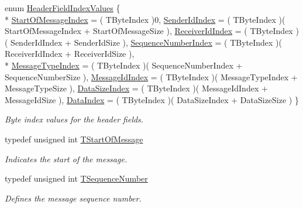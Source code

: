 \begin{DoxyCompactItemize}
enum \hyperlink{class_terra_swarm_1_1_message_header_a2a96f83a96cfee0465da982814cb372a}{Header\-Field\-Index\-Values} \{ \\*
\hyperlink{class_terra_swarm_1_1_message_header_a2a96f83a96cfee0465da982814cb372aa74b66ff4fa355a80faf96e67ce47f679}{Start\-Of\-Message\-Index} = ( T\-Byte\-Index )0, 
\hyperlink{class_terra_swarm_1_1_message_header_a2a96f83a96cfee0465da982814cb372aa468f5b005cd4374790f76469c53b6708}{Sender\-Id\-Index} = ( T\-Byte\-Index )( Start\-Of\-Message\-Index + Start\-Of\-Message\-Size ), 
\hyperlink{class_terra_swarm_1_1_message_header_a2a96f83a96cfee0465da982814cb372aabe5cfb032e70c35d03586a7d16d66490}{Receiver\-Id\-Index} = ( T\-Byte\-Index )( Sender\-Id\-Index + Sender\-Id\-Size ), 
\hyperlink{class_terra_swarm_1_1_message_header_a2a96f83a96cfee0465da982814cb372aa56286e86c6b2fb61f58f34c4fed8c28e}{Sequence\-Number\-Index} = ( T\-Byte\-Index )( Receiver\-Id\-Index + Receiver\-Id\-Size ), 
\\*
\hyperlink{class_terra_swarm_1_1_message_header_a2a96f83a96cfee0465da982814cb372aa636e016fbe208240bd9d92af77fd747a}{Message\-Type\-Index} = ( T\-Byte\-Index )( Sequence\-Number\-Index + Sequence\-Number\-Size ), 
\hyperlink{class_terra_swarm_1_1_message_header_a2a96f83a96cfee0465da982814cb372aa683b7a06a5ebe8befe0dcae6701c3003}{Message\-Id\-Index} = ( T\-Byte\-Index )( Message\-Type\-Index + Message\-Type\-Size ), 
\hyperlink{class_terra_swarm_1_1_message_header_a2a96f83a96cfee0465da982814cb372aa8bf63201f7bd66a6757cefa82db24548}{Data\-Size\-Index} = ( T\-Byte\-Index )( Message\-Id\-Index + Message\-Id\-Size ), 
\hyperlink{class_terra_swarm_1_1_message_header_a2a96f83a96cfee0465da982814cb372aa0306ff2262dbf1c9df9328c28c2adc8d}{Data\-Index} = ( T\-Byte\-Index )( Data\-Size\-Index + Data\-Size\-Size )
 \}
\begin{DoxyCompactList}\small\item\em Byte index values for the header fields. \end{DoxyCompactList}\item 
typedef unsigned int \hyperlink{class_terra_swarm_1_1_message_header_a2cf24e4a2eb361223ae61052630dfe24}{T\-Start\-Of\-Message}
\begin{DoxyCompactList}\small\item\em Indicates the start of the message. \end{DoxyCompactList}\item 
typedef unsigned int \hyperlink{class_terra_swarm_1_1_message_header_a0d92af0bc15cc856a21975d1f3813eb5}{T\-Sequence\-Number}
\begin{DoxyCompactList}\small\item\em Defines the message sequence number. \end{DoxyCompactList}\item 

\end{DoxyCompactItemize}
